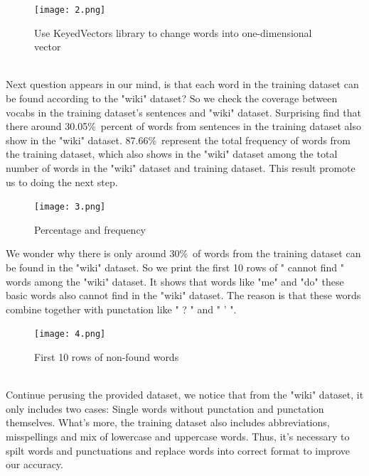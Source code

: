\documentclass{article}
\begin{document}
\begin{figure}[h]
	\centering
	\texttt{[image: 2.png]}
	\caption{Use KeyedVectors library to change words into one-dimensional vector}
\end{figure}\\
\noindent Next question appears in our mind, is that each word in the training dataset can be found according to the "wiki" dataset? So we check the coverage between vocabs in the training dataset's sentences and "wiki" dataset. Surprising find that there around 30.05\%\ percent of words from sentences in the training dataset also show in the "wiki" dataset. 87.66\%\ represent the total frequency of words from the training dataset, which also shows in the "wiki" dataset among the total number of words in the "wiki" dataset and training dataset. This result promote us to doing the next step.\\

\begin{figure}[h]
	\centering
	\texttt{[image: 3.png]}
	\caption{Percentage and frequency}
\end{figure}
\noindent We wonder why there is only around 30\%\  of words from the training dataset can be found in the "wiki" dataset. So we print the first 10 rows of " cannot find " words among the "wiki" dataset. It shows that words like "me" and "do" these basic words also cannot find in the "wiki" dataset. The reason is that these words combine together with punctation like " ? " and " ' ". \\
\begin{figure}[h]
	\centering
	\texttt{[image: 4.png]}
	\caption{First 10 rows of non-found words}
\end{figure}\\
\noindent Continue perusing the provided dataset, we notice that from the "wiki" dataset, it only includes two cases: Single words without punctation and punctation themselves. What's more, the training dataset also includes abbreviations, misspellings and mix of lowercase and uppercase words. Thus, it's necessary to spilt words and punctuations and replace words into correct format to improve our accuracy.\\
\end{document}
